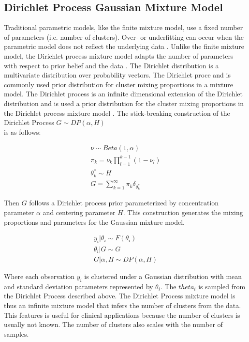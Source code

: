 \documentclass[10pt,letterpaper]{article}
\begin{document}
\subsection{Dirichlet Process Gaussian Mixture Model}
Traditional parametric models, like the finite mixture model, use a fixed number of parameters (i.e. number of clusters). Over- or underfitting can occur when the parametric model does not reflect the underlying data \cite{teh2010dirichlet}. Unlike the finite mixture model, the Dirichlet process mixture model adapts the number of parameters with respect to prior belief and the data \cite{gelmanBayesianDataAnalysis2013, antoniakMixturesDirichletProcesses1974}. The Dirichlet distribution is a multivariate distribution over probability vectors. The Dirichlet proce and is commonly used prior distribution for cluster mixing proportions in a mixture model. The Dirichlet process is an infinite dimensional extension of the Dirichlet distribution and is used a prior distribution for the cluster mixing proportions in the Dirichlet process mixture model \cite{muller2004nonparametric, gorurDirichletProcessGaussian2010}. The stick-breaking construction of the Dirichlet Process $G \sim DP(\alpha, H)$ \\ is as follows:

\begin{eqnarray}
\label{eq:dp}
\nu \sim Beta(1, \alpha) \nonumber \\
\pi_k = \nu_k \prod_{l=1}^{k-1}(1 - \nu_l) \nonumber\\
\theta_k^{*} \sim H \nonumber \\
G = \sum_{k=1}^{\infty} \pi_k \delta_{\theta_k^{*}} \nonumber
\end{eqnarray}

Then $G$ follows a Dirichlet process prior parameterized by concentration parameter $\alpha$ and centering parameter $H$. This construction generates the mixing proportions and parameters for the Gaussian mixture model.

\begin{eqnarray}
\label{eq:mm}
y_i | \theta_{i} \sim F(\theta_i) \nonumber \\
\theta_i | G \sim G \nonumber \\
G | \alpha, H \sim DP(\alpha, H) \nonumber
\end{eqnarray}

Where each observation $y_i$ is clustered under a Gaussian distribution with mean and standard deviation parameters represented by $\theta_i$. The $theta_i$ is sampled from the Dirichlet Process described above. The Dirichlet Process mixture model is thus an infinite mixture model that infers the number of clusters from the data. This features is useful for clinical applications because the number of clusters is usually not known. The number of clusters also scales with the number of samples.
\end{document}
